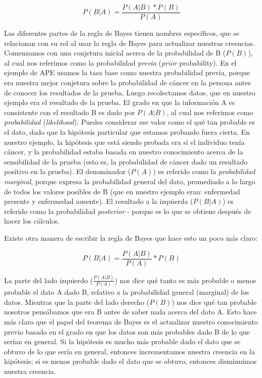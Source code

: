 \documentclass[
  12pt,
]{book}
\theoremstyle{definition}
\theoremstyle{definition}
\theoremstyle{definition}
\theoremstyle{remark}
\begin{document}
\[
P(B|A) =  \frac{P(A|B)*P(B)}{P(A)}
\]

Las diferentes partes de la regla de Bayes tienen nombres específicos, que se relacionan con su rol al usar la regla de Bayes para actualizar nuestras creencias. Comenzamos con una conjetura inicial acerca de la probabilidad de B (\(P(B)\)), al cual nos referimos como la probabilidad \emph{previa} (\emph{prior} probability). En el ejemplo de APE usamos la tasa base como nuestra probabilidad previa, porque era nuestra mejor conjetura sobre la probabilidad de cáncer en la persona antes de conocer los resultados de la prueba. Luego recolectamos datos, que en nuestro ejemplo era el resultado de la prueba. El grado en que la información A es consistente con el resultado B es dado por \(P(A|B)\), al cual nos referimos como \emph{probabilidad} (\emph{likelihood}). Puedes considerar ese valor como el qué tan probable es el dato, dado que la hipótesis particular que estamos probando fuera cierta. En nuestro ejemplo, la hipótesis que está siendo probada era si el individuo tenía cáncer, y la probabilidad estaba basada en nuestro conocimiento acerca de la sensibilidad de la prueba (esto es, la probabilidad de cáncer dado un resultado positivo en la prueba). El denominador (\(P(A)\)) es referido como la \emph{probabilidad marginal}, porque expresa la probabilidad general del dato, promediado a lo largo de todos los valores posibles de B (que en nuestro ejemplo eran: enfermedad presente y enfermedad ausente).
El resultado a la izquierda (\(P(B|A)\)) es referido como la probabilidad \emph{posterior} - porque es lo que se obtiene después de hacer los cálculos.

Existe otra manera de escribir la regla de Bayes que hace esto un poco más claro:

\[
P(B|A) = \frac{P(A|B)}{P(A)}*P(B)
\]

La parte del lado izquierdo (\(\frac{P(A|B)}{P(A)}\)) nos dice qué tanto es más probable o menos probable el dato A dado B, relativo a la probabilidad general (marginal) de los datos. Mientras que la parte del lado derecho (\(P(B)\)) nos dice qué tan probable nosotros pensábamos que era B antes de saber nada acerca del dato A. Esto hace más claro que el papel del teorema de Bayes es el actualizar nuestro conocimiento previo basado en el grado en que los datos son más probables dado B de lo que serían en general. Si la hipótesis es mucho más probable dado el dato que se obtuvo de lo que sería en general, entonces incrementamos nuestra creencia en la hipótesis; si es menos probable dado el dato que se obtuvo, entonces disminuimos nuestra creencia.
\end{document}
